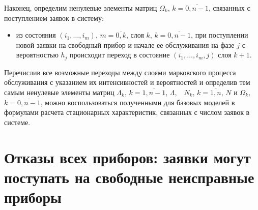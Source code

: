 \begin{multicols}{2}
Наконец, определим ненулевые элементы мат\-риц
$\Omega_k$, $k=\overline{0,n-1}$,
связанных с поступлением заявок в систему:
\begin{itemize}
\item из состояния $(i_1,\ldots,i_m)$, $m=\overline{0,k}$, слоя
$k$, $k=\overline{0,n-1}$, при поступлении новой заявки на
свободный прибор и начале ее обслуживания на фазе $j$ с
вероятностью $h_j$ происходит переход в состояние
$(i_1,\ldots,i_m,j)$ слоя $k+1$.
\end{itemize}

Перечислив все возможные переходы между слоями марковского процесса
обслуживания с указанием их интенсивностей и вероятностей  и
определив тем самым ненулевые элементы матриц
$\Lambda_k$, $k=\overline{1,n-1}$, $\Lambda$,\ \ $N_k$,
$k=\overline{1,n}$, $N$ и $\Omega_k$, $k=\overline{0,n-1}$,
можно воспользоваться полученными для базовых моделей в~\cite{PSC07_1, PC04}
формулами расчета стационарных характеристик, связанных с числом
заявок в системе.

\section{Отказы всех приборов: заявки могут поступать на свободные
неисправные приборы}


\end{multicols}
